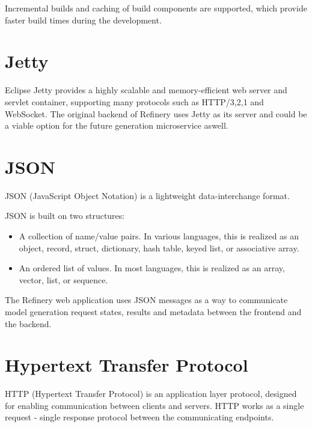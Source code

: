 	Incremental builds and caching of build components are supported, which provide faster build times during the development.

\section{Jetty} \label{backgrjetty}
	Eclipse Jetty \cite{jetty} provides a highly scalable and memory-efficient web server and servlet container, supporting many protocols
	 such as HTTP/3,2,1 and WebSocket. The original backend of Refinery uses Jetty as its server and could be a viable option for the future generation
	 microservice aswell.

\section{JSON} \label{backgrjson}
	JSON (JavaScript Object Notation) \cite{json} is a lightweight data-interchange format. 

	JSON is built on two structures:
	\begin{itemize}
		\item A collection of name/value pairs. In various languages, this is realized as an object, record, struct, dictionary, hash table, 
		keyed list, or associative array.
		\item An ordered list of values. In most languages, this is realized as an array, vector, list, or sequence.
	\end{itemize}

	The Refinery web application uses JSON messages as a way to communicate model generation request states, results and metadata between the frontend and the backend.

\section{Hypertext Transfer Protocol} \label{backgrrestapi}
	HTTP (Hypertext Transfer Protocol) \cite{httpdoc} is an application layer protocol, designed for enabling communication between clients and servers. 
	HTTP works as a single request - single response protocol between the communicating endpoints.


